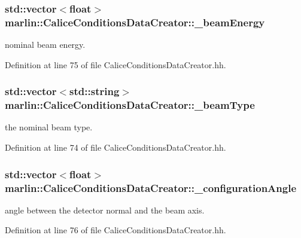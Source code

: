 \subsubsection[{\_\-beamEnergy}]{\setlength{\rightskip}{0pt plus 5cm}std::vector$<$float$>$ {\bf marlin::CaliceConditionsDataCreator::\_\-beamEnergy}\hspace{0.3cm}{\ttfamily  [protected]}}\label{classmarlin_1_1CaliceConditionsDataCreator_af8aa319f5771ba7bfcf4c3be1c36cf4f}


nominal beam energy. 

Definition at line 75 of file CaliceConditionsDataCreator.hh.
\subsubsection[{\_\-beamType}]{\setlength{\rightskip}{0pt plus 5cm}std::vector$<$std::string$>$ {\bf marlin::CaliceConditionsDataCreator::\_\-beamType}\hspace{0.3cm}{\ttfamily  [protected]}}\label{classmarlin_1_1CaliceConditionsDataCreator_a0c0658ad562522454b5c278757e02118}


the nominal beam type. 

Definition at line 74 of file CaliceConditionsDataCreator.hh.
\subsubsection[{\_\-configurationAngle}]{\setlength{\rightskip}{0pt plus 5cm}std::vector$<$float$>$ {\bf marlin::CaliceConditionsDataCreator::\_\-configurationAngle}\hspace{0.3cm}{\ttfamily  [protected]}}\label{classmarlin_1_1CaliceConditionsDataCreator_ae54f3d9bb7f189e2b888c1f3a5aac59c}


angle between the detector normal and the beam axis. 

Definition at line 76 of file CaliceConditionsDataCreator.hh.
